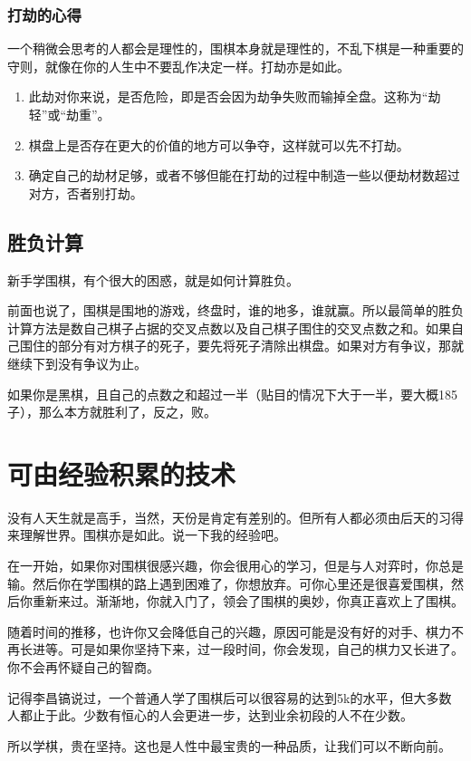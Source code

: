 \documentclass[12pt，a4paper, titlepage]{article}
\begin{document}
\subsubsection{打劫的心得}
一个稍微会思考的人都会是理性的，围棋本身就是理性的，不乱下棋是一种重要的守则，就像在你的人生中不要乱作决定一样。打劫亦是如此。
\begin{enumerate}
\item 此劫对你来说，是否危险，即是否会因为劫争失败而输掉全盘。这称为“劫轻”或“劫重”。
\item 棋盘上是否存在更大的价值的地方可以争夺，这样就可以先不打劫。
\item 确定自己的劫材足够，或者不够但能在打劫的过程中制造一些以便劫材数超过对方，否者别打劫。
\end{enumerate}

\subsection{胜负计算}
新手学围棋，有个很大的困惑，就是如何计算胜负。

前面也说了，围棋是围地的游戏，终盘时，谁的地多，谁就赢。所以最简单的胜负计算方法是数自己棋子占据的交叉点数以及自己棋子围住的交叉点数之和。如果自己围住的部分有对方棋子的死子，要先将死子清除出棋盘。如果对方有争议，那就继续下到没有争议为止。

如果你是黑棋，且自己的点数之和超过一半（贴目的情况下大于一半，要大概185子），那么本方就胜利了，反之，败。

\section{可由经验积累的技术}
没有人天生就是高手，当然，天份是肯定有差别的。但所有人都必须由后天的习得来理解世界。围棋亦是如此。说一下我的经验吧。

在一开始，如果你对围棋很感兴趣，你会很用心的学习，但是与人对弈时，你总是输。然后你在学围棋的路上遇到困难了，你想放弃。可你心里还是很喜爱围棋，然后你重新来过。渐渐地，你就入门了，领会了围棋的奥妙，你真正喜欢上了围棋。

随着时间的推移，也许你又会降低自己的兴趣，原因可能是没有好的对手、棋力不再长进等。可是如果你坚持下来，过一段时间，你会发现，自己的棋力又长进了。你不会再怀疑自己的智商。

记得李昌镐说过，一个普通人学了围棋后可以很容易的达到5k的水平，但大多数人都止于此。少数有恒心的人会更进一步，达到业余初段的人不在少数。

所以学棋，贵在坚持。这也是人性中最宝贵的一种品质，让我们可以不断向前。
\end{document}
